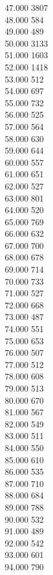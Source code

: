 { 47.000	3807 \\
 48.000	584 \\
 49.000	489 \\
 50.000	3133 \\
 51.000	1603 \\
 52.000	1418 \\
 53.000	512 \\
 54.000	697 \\
 55.000	732 \\
 56.000	525 \\
 57.000	564 \\
 58.000	630 \\
 59.000	644 \\
 60.000	557 \\
 61.000	651 \\
 62.000	527 \\
 63.000	801 \\
 64.000	520 \\
 65.000	769 \\
 66.000	632 \\
 67.000	700 \\
 68.000	678 \\
 69.000	714 \\
 70.000	733 \\
 71.000	527 \\
 72.000	668 \\
 73.000	487 \\
 74.000	551 \\
 75.000	653 \\
 76.000	507 \\
 77.000	512 \\
 78.000	608 \\
 79.000	513 \\
 80.000	670 \\
 81.000	567 \\
 82.000	549 \\
 83.000	511 \\
 84.000	550 \\
 85.000	610 \\
 86.000	535 \\
 87.000	710 \\
 88.000	684 \\
 89.000	788 \\
 90.000	532 \\
 91.000	489 \\
 92.000	542 \\
 93.000	601 \\
 94.000	790 \\
}
